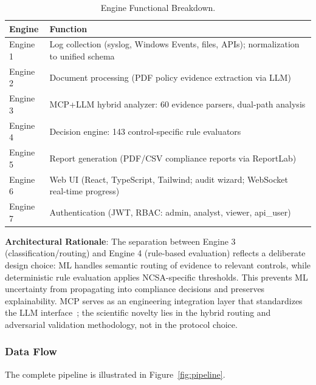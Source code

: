 \documentclass[futureinternet,article,submit,pdftex,moreauthors]{Definitions/mdpi}
\begin{document}
\begin{table}[H]
\caption{Engine Functional Breakdown.\label{tab:engines}}
\begin{tabularx}{\textwidth}{lX}
\toprule
\textbf{Engine} & \textbf{Function} \\
\midrule
Engine 1 & Log collection (syslog, Windows Events, files, APIs); normalization to unified schema \\
Engine 2 & Document processing (PDF policy evidence extraction via LLM) \\
Engine 3 & MCP+LLM hybrid analyzer: 60 evidence parsers, dual-path analysis \\
Engine 4 & Decision engine: 143 control-specific rule evaluators \\
Engine 5 & Report generation (PDF/CSV compliance reports via ReportLab) \\
Engine 6 & Web UI (React, TypeScript, Tailwind; audit wizard; WebSocket real-time progress) \\
Engine 7 & Authentication (JWT, RBAC: admin, analyst, viewer, api\_user) \\
\bottomrule
\end{tabularx}
\end{table}

\textbf{Architectural Rationale}: The separation between Engine 3 (classification/routing) and
Engine 4 (rule-based evaluation) reflects a deliberate design choice: ML handles semantic
routing of evidence to relevant controls, while deterministic rule evaluation applies
NCSA-specific thresholds. This prevents ML uncertainty from propagating into compliance
decisions and preserves explainability. MCP serves as an engineering integration layer
that standardizes the LLM interface~\cite{mcp_enterprise,mcp_landscape}; the scientific novelty lies
in the hybrid routing and adversarial validation methodology, not in the protocol choice.

\subsubsection{Data Flow}

The complete pipeline is illustrated in Figure~\ref{fig:pipeline}.
\end{document}
